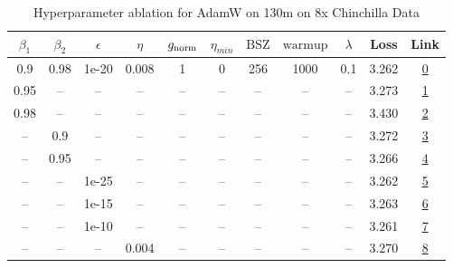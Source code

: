 \begin{table}[H]
\centering
\caption{Hyperparameter ablation for AdamW on 130m on 8x Chinchilla Data}
\label{tab:ablation_adamw_130m_on_8x_chinchilla_data}
\begin{tabular}{ccccccccccc}
\toprule
$\beta_1$ & $\beta_2$ & $\epsilon$ & $\eta$ & $g_{\mathrm{norm}}$ & $\eta_{min}$ & $\mathrm{BSZ}$ & $\mathrm{warmup}$ & $\lambda$ & Loss & Link \\
\midrule
0.9 & 0.98 & 1e-20 & 0.008 & 1 & 0 & 256 & 1000 & 0.1 & 3.262 & \href{https://wandb.ai/marin-community/optimizer-scaling/runs/sweep-130m-21B-adamwc00703lr0.008-wd0.1-minlr0-warmup1000-b10.9--d73c2c}{0} \\
\midrule
0.95 & -- & -- & -- & -- & -- & -- & -- & -- & 3.273 & \href{https://wandb.ai/marin-community/optimizer-scaling/runs/sweep-130m-21B-adamwd5d639lr0.008-wd0.1-minlr0-warmup1000-b10.95-658eb8}{1} \\
0.98 & -- & -- & -- & -- & -- & -- & -- & -- & 3.430 & \href{https://wandb.ai/marin-community/optimizer-scaling/runs/sweep-130m-21B-adamw0cb2d6lr0.008-wd0.1-minlr0-warmup1000-b10.98-7c952d}{2} \\
-- & 0.9 & -- & -- & -- & -- & -- & -- & -- & 3.272 & \href{https://wandb.ai/marin-community/optimizer-scaling/runs/sweep-130m-21B-adamwe479a6lr0.008-wd0.1-minlr0-warmup1000-b10.9--7570fe}{3} \\
-- & 0.95 & -- & -- & -- & -- & -- & -- & -- & 3.266 & \href{https://wandb.ai/marin-community/optimizer-scaling/runs/sweep-130m-21B-adamw63b609lr0.008-wd0.1-minlr0-warmup1000-b10.9--2da2b5}{4} \\
-- & -- & 1e-25 & -- & -- & -- & -- & -- & -- & 3.262 & \href{https://wandb.ai/marin-community/optimizer-scaling/runs/sweep-130m-21B-adamwc0b69dlr0.008-wd0.1-minlr0-warmup1000-b10.9--2390cc}{5} \\
-- & -- & 1e-15 & -- & -- & -- & -- & -- & -- & 3.263 & \href{https://wandb.ai/marin-community/optimizer-scaling/runs/sweep-130m-21B-adamw9248c1lr0.008-wd0.1-minlr0-warmup1000-b10.9--7ae1a8}{6} \\
-- & -- & 1e-10 & -- & -- & -- & -- & -- & -- & 3.261 & \href{https://wandb.ai/marin-community/optimizer-scaling/runs/sweep-130m-21B-adamw357d4clr0.008-wd0.1-minlr0-warmup1000-b10.9--27bdc1}{7} \\
-- & -- & -- & 0.004 & -- & -- & -- & -- & -- & 3.270 & \href{https://wandb.ai/marin-community/optimizer-scaling/runs/sweep-130m-21B-adamwdb2f39lr0.004-wd0.1-minlr0-warmup1000-b10.9--cf39b6}{8} \\

\end{tabular}
\end{table}
